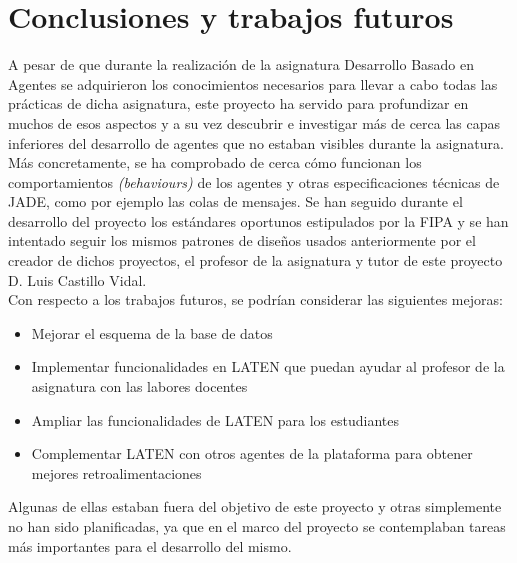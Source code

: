 \chapter{Conclusiones y trabajos futuros}

A pesar de que durante la realización de la asignatura Desarrollo Basado en Agentes se adquirieron los conocimientos necesarios para llevar a cabo todas las prácticas de dicha asignatura, este proyecto ha servido para profundizar en muchos de esos aspectos y a su vez descubrir e investigar más de cerca las capas inferiores del desarrollo de agentes que no estaban visibles durante la asignatura.\\

Más concretamente, se ha comprobado de cerca cómo funcionan los comportamientos \textit{(behaviours)} de los agentes y otras especificaciones técnicas de JADE, como por ejemplo las colas de mensajes. Se han seguido durante el desarrollo del proyecto los estándares oportunos estipulados por la FIPA y se han intentado seguir los mismos patrones de diseños usados anteriormente por el creador de dichos proyectos, el profesor de la asignatura y tutor de este proyecto D. Luis Castillo Vidal.\\

Con respecto a los trabajos futuros, se podrían considerar las siguientes mejoras:\\

\begin{itemize}
	\item Mejorar el esquema de la base de datos
	\item Implementar funcionalidades en LATEN que puedan ayudar al profesor de la asignatura con las labores docentes
	\item Ampliar las funcionalidades de LATEN para los estudiantes
	\item Complementar LATEN con otros agentes de la plataforma para obtener mejores retroalimentaciones
\end{itemize}

Algunas de ellas estaban fuera del objetivo de este proyecto y otras simplemente no han sido planificadas, ya que en el marco del proyecto se contemplaban tareas más importantes para el desarrollo del mismo.